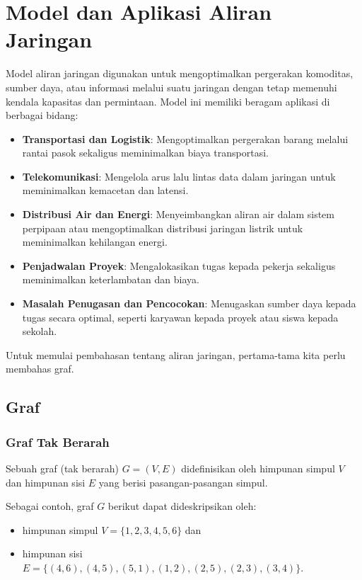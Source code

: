 
\section{Model dan Aplikasi Aliran Jaringan}
\label{sec:network-flow-models}

Model aliran jaringan digunakan untuk mengoptimalkan pergerakan komoditas, sumber daya, atau informasi melalui suatu jaringan dengan tetap memenuhi kendala kapasitas dan permintaan. Model ini memiliki beragam aplikasi di berbagai bidang:

\begin{itemize}
    \item \textbf{Transportasi dan Logistik}: Mengoptimalkan pergerakan barang melalui rantai pasok sekaligus meminimalkan biaya transportasi.
    \item \textbf{Telekomunikasi}: Mengelola arus lalu lintas data dalam jaringan untuk meminimalkan kemacetan dan latensi.
    \item \textbf{Distribusi Air dan Energi}: Menyeimbangkan aliran air dalam sistem perpipaan atau mengoptimalkan distribusi jaringan listrik untuk meminimalkan kehilangan energi.
    \item \textbf{Penjadwalan Proyek}: Mengalokasikan tugas kepada pekerja sekaligus meminimalkan keterlambatan dan biaya.
    \item \textbf{Masalah Penugasan dan Pencocokan}: Menugaskan sumber daya kepada tugas secara optimal, seperti karyawan kepada proyek atau siswa kepada sekolah.
\end{itemize}

Untuk memulai pembahasan tentang aliran jaringan, pertama-tama kita perlu membahas graf.

\subsection{Graf}

\subsubsection{Graf Tak Berarah}
\begin{definition}{}
Sebuah graf (tak berarah) $G = (V,E)$ didefinisikan oleh himpunan simpul $V$ dan himpunan sisi $E$ yang berisi pasangan-pasangan simpul.
\end{definition}

Sebagai contoh, graf $G$ berikut dapat dideskripsikan oleh:
\begin{itemize}
\item himpunan simpul $V = \{1,2,3,4,5,6\}$ dan
\item himpunan sisi $E = \{(4,6),(4,5), (5,1), (1,2), (2,5), (2,3), (3,4)\}$.
\end{itemize}

